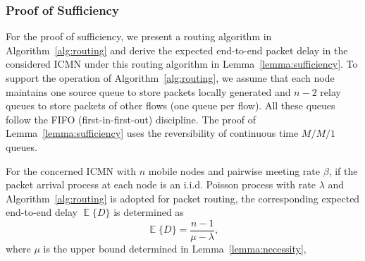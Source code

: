 \documentclass[twocolumn, 10pt]{svjour3}         \smartqed  \usepackage{graphicx}
\DeclareMathOperator*{\E}{\mathbb{E}}
\begin{document}
\subsubsection{Proof of Sufficiency}\label{sec:sufficiency}
For the proof of sufficiency, we  present a routing algorithm in Algorithm~\ref{alg:routing} and  derive the expected end-to-end packet delay in the considered ICMN under this routing algorithm in Lemma~\ref{lemma:sufficiency}.
To support the operation of Algorithm~\ref{alg:routing}, we assume that each node maintains one source queue to store packets locally generated  and  $n - 2$  relay queues to store packets of other flows (one queue per flow). All these queues follow the FIFO (first-in-first-out) discipline. The proof of Lemma~\ref{lemma:sufficiency} uses the reversibility of continuous time $M/M/1$ queues.















\begin{lemma}\label{lemma:sufficiency}
For the concerned ICMN with $n$ mobile nodes and  pairwise meeting rate $\beta$, if the packet arrival process at each node is an i.i.d. Poisson  process with rate $\lambda$ and Algorithm~\ref{alg:routing} is adopted for packet routing,   the corresponding expected end-to-end delay $\E\{D\}$ is determined as
\begin{equation}\label{eqn:delay}
	\E\{D\} = \frac{n-1}{\mu-\lambda},
\end{equation}
where $\mu$ is the upper bound determined in Lemma~\ref{lemma:necessity}, 
\end{lemma}
\end{document}
